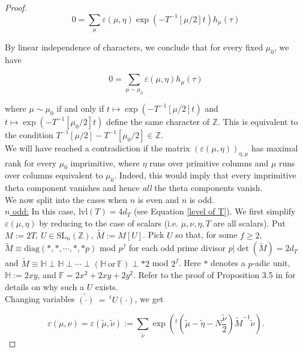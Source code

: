 \documentclass[11pt]{article}
\theoremstyle{definition}
\theoremstyle{remark}
\newcommand{\h}{\mathbb{H}}
\begin{document}
\begin{proof}
\[
    0 = \sum_\mu \varepsilon(\mu, \eta) \exp(-T^{-1}[\mu/2] t) h_\mu(\tau) 
\]

By linear independence of characters, we conclude that for every fixed $\mu_0$, we have 

\begin{equation}
0 = \sum_{\mu \sim \mu_0} \varepsilon(\mu,\eta) h_\mu(\tau) \label{reduced relation}
\end{equation}

where $\mu \sim \mu_0$ if and only if $t \mapsto \exp(-T^{-1}[\mu/2] t)$ and $t \mapsto \exp(-T^{-1}[\mu_0/2] t)$ define the same character of $\mathbb{Z}$. This is equivalent to the condition $T^{-1}[\mu/2] - T^{-1}[\mu_0/2] \in \mathbb{Z}$. \\

We will have reached a contradiction if the matrix $(\varepsilon(\mu,\eta))_{\eta,\mu}$ has maximal rank for every $\mu_0$ imprimitive, where $\eta$ runs over primitive columns and $\mu$ runs over columns equivalent to $\mu_0$. Indeed, this would imply that every imprimitive theta component vanishes and hence \textit{all} the theta components vanish. \\

We now split into the cases when $n$ is even and $n$ is odd. \\

\underline{$n$ odd:} In this case, $\mathrm{lvl}(T) = 4d_T$ (see Equation \ref{level of T}). We first simplify $\varepsilon(\mu,\eta)$ by reducing to the case of scalars (i.e. $\mu,\nu,\eta,T$ are all scalars). Put $M := 2T$, $U \in \text{SL}_n(\mathbb{Z})$, $\widetilde{M} := M[U]$. Pick $U$ so that, for some $f \geq 2$, $\widetilde{M} \equiv \text{diag}( \ast, \ast, \cdots , \ast, \ast p)$ mod $p^f$ for each odd prime divisor $p \vert \det(\widetilde{M}) = 2d_T$ and $\widetilde{M} \equiv \mathbb{H}\perp \mathbb{H}\perp \cdots \perp (\mathbb{H}\ \text{or} \ \mathbb{F}) \perp \ast 2$ mod $2^f$. Here $\ast$ denotes a $p$-adic unit, $\h := 2xy$, and $\mathbb{F} = 2x^2 + 2xy + 2y^2$. Refer to the proof of Proposition 3.5 in \cite{BD} for details on why such a $U$ exists.\\

Changing variables $\widetilde{( \cdot )} \ = \ ^tU ( \cdot )$, we get 

\[
\varepsilon(\mu,\nu) = \varepsilon(\tilde{\mu},\tilde{\nu}) := \sum_{\tilde{\nu}} \exp\left(^t (\tilde{\mu} - \tilde{\eta} - N\frac{\tilde{\nu}}{2})\widetilde{M}^{-1} \tilde{\nu}\right).
\]


\end{proof}
\end{document}
